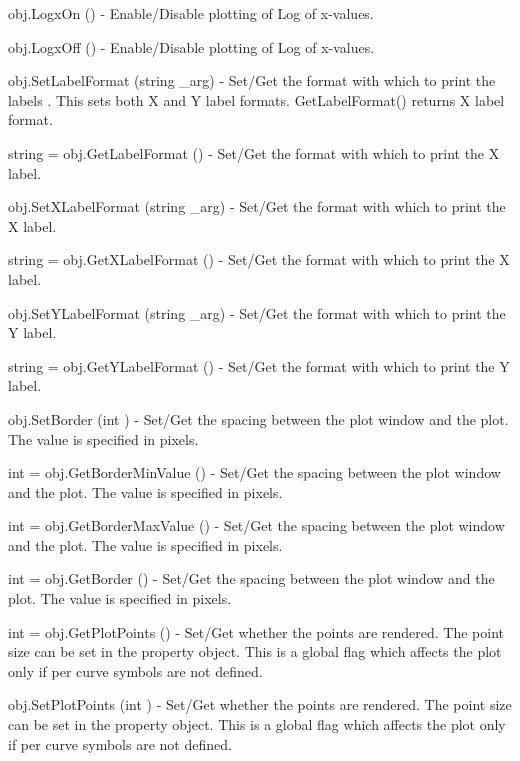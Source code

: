 \begin{DoxyItemize}
\item {\ttfamily obj.\-Logx\-On ()} -\/ Enable/\-Disable plotting of Log of x-\/values.  
\item {\ttfamily obj.\-Logx\-Off ()} -\/ Enable/\-Disable plotting of Log of x-\/values.  
\item {\ttfamily obj.\-Set\-Label\-Format (string \-\_\-arg)} -\/ Set/\-Get the format with which to print the labels . This sets both X and Y label formats. Get\-Label\-Format() returns X label format.  
\item {\ttfamily string = obj.\-Get\-Label\-Format ()} -\/ Set/\-Get the format with which to print the X label.  
\item {\ttfamily obj.\-Set\-X\-Label\-Format (string \-\_\-arg)} -\/ Set/\-Get the format with which to print the X label.  
\item {\ttfamily string = obj.\-Get\-X\-Label\-Format ()} -\/ Set/\-Get the format with which to print the X label.  
\item {\ttfamily obj.\-Set\-Y\-Label\-Format (string \-\_\-arg)} -\/ Set/\-Get the format with which to print the Y label.  
\item {\ttfamily string = obj.\-Get\-Y\-Label\-Format ()} -\/ Set/\-Get the format with which to print the Y label.  
\item {\ttfamily obj.\-Set\-Border (int )} -\/ Set/\-Get the spacing between the plot window and the plot. The value is specified in pixels.  
\item {\ttfamily int = obj.\-Get\-Border\-Min\-Value ()} -\/ Set/\-Get the spacing between the plot window and the plot. The value is specified in pixels.  
\item {\ttfamily int = obj.\-Get\-Border\-Max\-Value ()} -\/ Set/\-Get the spacing between the plot window and the plot. The value is specified in pixels.  
\item {\ttfamily int = obj.\-Get\-Border ()} -\/ Set/\-Get the spacing between the plot window and the plot. The value is specified in pixels.  
\item {\ttfamily int = obj.\-Get\-Plot\-Points ()} -\/ Set/\-Get whether the points are rendered. The point size can be set in the property object. This is a global flag which affects the plot only if per curve symbols are not defined.  
\item {\ttfamily obj.\-Set\-Plot\-Points (int )} -\/ Set/\-Get whether the points are rendered. The point size can be set in the property object. This is a global flag which affects the plot only if per curve symbols are not defined.  

\end{DoxyItemize}
